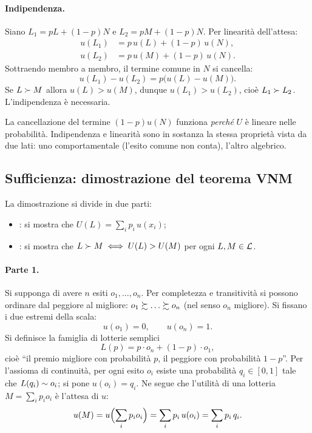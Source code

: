 \paragraph{Indipendenza.}
Siano $L_1 = pL + (1-p)N$ e $L_2 = pM + (1-p)N$. Per linearità dell'attesa:
\begin{align*}
  u(L_1) &= p\,u(L) + (1-p)\,u(N),\\
  u(L_2) &= p\,u(M) + (1-p)\,u(N).
\end{align*}
Sottraendo membro a membro, il termine comune in $N$ si cancella:
\[
  u(L_1) - u(L_2) = p\bigl(u(L) - u(M)\bigr).
\]
Se $L \succ M$ allora $u(L) > u(M)$, dunque $u(L_1) > u(L_2)$, cioè $L_1 \succ L_2$.
L'indipendenza è necessaria.

\begin{osservazione}
La cancellazione del termine $(1-p)u(N)$ funziona \emph{perché} $U$ è lineare nelle
probabilità. Indipendenza e linearità sono in sostanza la stessa proprietà vista da due
lati: uno comportamentale (l'esito comune non conta), l'altro algebrico.
\end{osservazione}

\subsection{Sufficienza: dimostrazione del teorema VNM}

La dimostrazione si divide in due parti:
\begin{itemize}
  \item {}: si mostra che $U(L) = \sum_{i} p_i\,u(x_i)$;
  \item {}: si mostra che $L \succ M \iff U(L) > U(M)$ per ogni $L,M \in \mathcal{L}$.
\end{itemize}

\paragraph{Parte 1.}
Si supponga di avere $n$ esiti $o_1,\dots,o_n$. Per completezza e transitività si possono
ordinare dal peggiore al migliore: $o_1 \pref \dots \pref o_n$ (nel senso $o_n$ migliore).
Si fissano i due estremi della scala:
\[
  u(o_1) = 0, \qquad u(o_n) = 1 .
\]
Si definisce la famiglia di lotterie semplici
\[
  L(p) = p \cdot o_n + (1-p) \cdot o_1 ,
\]
cioè ``il premio migliore con probabilità $p$, il peggiore con probabilità $1-p$''.
Per l'assioma di continuità, per ogni esito $o_i$ esiste una probabilità $q_i \in [0,1]$
tale che $L(q_i) \sim o_i$; si pone $u(o_i) = q_i$. Ne segue che l'utilità di una
lotteria $M = \sum_i p_i o_i$ è l'attesa di $u$:
\[
  u(M) = u\Bigl(\sum_i p_i o_i\Bigr) = \sum_i p_i\,u(o_i) = \sum_i p_i\,q_i .
\]

